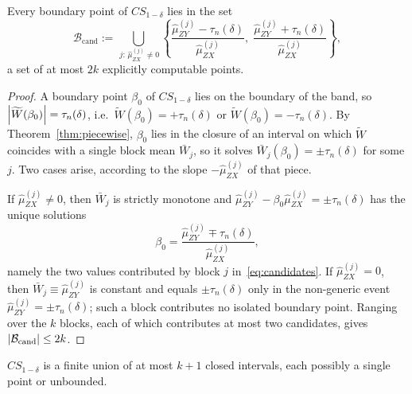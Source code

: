 \begin{corollary}
\label{cor:endpoints}
Every boundary point of $CS_{1-\delta}$ lies in the set
\begin{equation}
  \mathcal{B}_{\mathrm{cand}}
    := \bigcup_{\,j:\,\hat{\mu}_{ZX}^{(j)}\neq 0}
       \left\{
         \frac{\hat{\mu}_{ZY}^{(j)}-\tau_n(\delta)}{\hat{\mu}_{ZX}^{(j)}},\;
         \frac{\hat{\mu}_{ZY}^{(j)}+\tau_n(\delta)}{\hat{\mu}_{ZX}^{(j)}}
       \right\},
  \label{eq:candidates}
\end{equation}
a set of at most $2k$ explicitly computable points.
\end{corollary}
 
\begin{proof}
A boundary point $\beta_0$ of $CS_{1-\delta}$ lies on the boundary of the band, so $\left|\widetilde{W}(\beta_0)\right|=\tau_n(\delta)$, i.e.\ $\widetilde{W}(\beta_0)=+\tau_n(\delta)$ or $\widetilde{W}(\beta_0)=-\tau_n(\delta)$. By Theorem~\ref{thm:piecewise}, $\beta_0$ lies in the closure of an interval on which $\widetilde{W}$ coincides with a single block mean $\bar{W}_j$, so it solves $\bar{W}_j(\beta_0)=\pm\tau_n(\delta)$ for some $j$. Two cases arise, according to the slope $-\hat{\mu}_{ZX}^{(j)}$ of that piece.

If $\hat{\mu}_{ZX}^{(j)}\neq 0$, then $\bar{W}_j$ is strictly monotone and $\hat{\mu}_{ZY}^{(j)}-\beta_0\hat{\mu}_{ZX}^{(j)}=\pm\tau_n(\delta)$ has the unique solutions
\[
    \beta_0 = \frac{\hat{\mu}_{ZY}^{(j)}\mp\tau_n(\delta)}{\hat{\mu}_{ZX}^{(j)}},
\]
namely the two values contributed by block $j$ in~\eqref{eq:candidates}. If $\hat{\mu}_{ZX}^{(j)}=0$, then $\bar{W}_j\equiv\hat{\mu}_{ZY}^{(j)}$ is constant and equals $\pm\tau_n(\delta)$ only in the non-generic event $\hat{\mu}_{ZY}^{(j)}=\pm\tau_n(\delta)$; such a block contributes no isolated boundary point. Ranging over the $k$ blocks, each of which contributes at most two candidates, gives $\left|\mathcal{B}_{\mathrm{cand}}\right|\le 2k$.
\end{proof}

\begin{corollary}
\label{cor:union}
$CS_{1-\delta}$ is a finite union of at most $k + 1$ closed intervals, each possibly a single point or unbounded.
\end{corollary}
 
